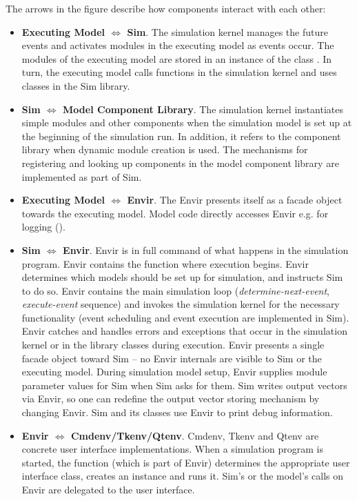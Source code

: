 The arrows in the figure describe how components interact with
each other:

\begin{itemize}
  \item \textbf{Executing Model $\Leftrightarrow$ Sim}. The simulation kernel
    manages the future events and activates modules in the executing model
    as events occur. The modules of the executing model are stored in an
    instance of the class . In turn, the executing model
    calls functions in the simulation kernel and uses classes in the Sim library.
  \item \textbf{Sim $\Leftrightarrow$ Model Component Library}. The simulation kernel
    instantiates simple modules and other components when the simulation model
    is set up at the beginning of the simulation run. In addition, it refers
    to the component library when dynamic module creation is used.
    The mechanisms for registering and looking up components in the model
    component library are implemented as part of Sim.
  \item \textbf{Executing Model $\Leftrightarrow$ Envir}. The Envir presents itself
    as a facade object towards the executing model. Model code directly accesses Envir
    e.g. for logging ().
  \item \textbf{Sim $\Leftrightarrow$ Envir}. Envir is in full command of what
    happens in the simulation program. Envir contains the  function
    where execution begins. Envir determines which models should be set up
    for simulation, and instructs Sim to do so. Envir contains the main
    simulation loop (\textit{determine-next-event}, \textit{execute-event}
    sequence) and invokes the simulation kernel for the necessary
    functionality (event scheduling and event execution are implemented in Sim).
    Envir catches and handles errors and exceptions that occur
    in the simulation kernel or in the library classes during execution.
    Envir presents a single facade object toward Sim -- no Envir
    internals are visible to Sim or the executing model.
    During simulation model setup, Envir supplies module parameter values for
    Sim when Sim asks for them. Sim writes output vectors via Envir,
    so one can redefine the output vector storing mechanism by changing Envir.
    Sim and its classes use Envir to print debug information.
  \item \textbf{Envir $\Leftrightarrow$ Cmdenv/Tkenv/Qtenv}. Cmdenv, Tkenv and Qtenv
    are concrete user interface implementations. When a simulation program
    is started, the  function (which is part of Envir) determines
    the appropriate user interface class, creates an instance and runs it.
    Sim's or the model's calls on Envir are delegated to the user interface.
\end{itemize}


